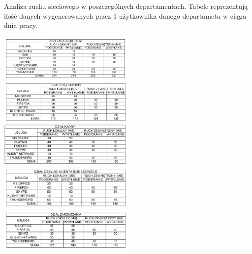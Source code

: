 \documentclass{report}
\begin{document}
\begin{table}[H]

\centering
\caption{Analiza ruchu sieciowego w poszczególnych departamentach.
Tabele reprezentują ilość danych wygenerowanych przez 1 użytkownika danego departametu w ciągu dnia pracy. \label{tab:analiza dzialy}}

\includegraphics[width=0.5\textwidth]{./obrazki/ruch_tabele/d_ok.png}
\includegraphics[width=0.5\textwidth]{./obrazki/ruch_tabele/d_k.png}
\includegraphics[width=0.5\textwidth]{./obrazki/ruch_tabele/d_kad.png}
\includegraphics[width=0.5\textwidth]{./obrazki/ruch_tabele/d_b.png}
\includegraphics[width=0.5\textwidth]{./obrazki/ruch_tabele/d_m.png}   

\end{table}
\end{document}
